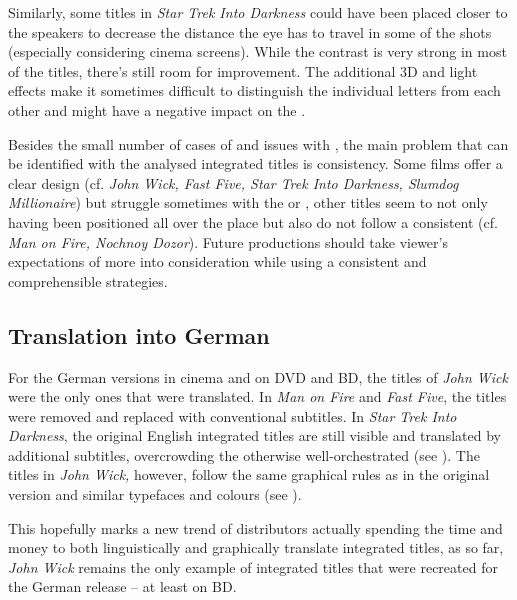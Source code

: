 Similarly, some titles in \textit{Star Trek Into Darkness} could have been placed closer to the speakers to decrease the distance the eye has to travel in some of the shots (especially considering cinema screens). While the contrast is very strong in most of the titles, there’s still room for improvement. The additional 3D and light effects make it sometimes difficult to distinguish the individual letters from each other and might have a negative impact on the . 

\newpage 
Besides the small number of cases of  and issues with , the main problem that can be identified with the analysed integrated titles is consistency. Some films offer a clear design (cf. \textit{John Wick, Fast Five, Star Trek Into Darkness, Slumdog Millionaire}) but struggle sometimes with the  or , other titles seem to not only having been positioned all over the place but also do not follow a consistent  (cf. \textit{Man on Fire, Nochnoy Dozor}). Future productions should take viewer’s expectations of  more into consideration while using a consistent  and comprehensible  strategies.

\subsection{Translation into German}\label{sec:4.2.3}

For the German versions in cinema and on DVD and BD, the titles of \textit{John Wick} were the only ones that were translated. In \textit{Man on Fire} and \textit{Fast Five}, the titles were removed and replaced with conventional subtitles. In \textit{Star Trek Into Darkness}, the original English integrated titles are still visible and translated by additional subtitles, overcrowding the otherwise well-orchestrated  (see ). The titles in \textit{John Wick,} however, follow the same graphical rules as in the original version and similar typefaces and colours (see ).



This hopefully marks a new trend of distributors actually spending the time and money to both linguistically and graphically translate integrated titles, as so far, \textit{John Wick} remains the only example of integrated titles that were recreated for the German release – at least on BD.

